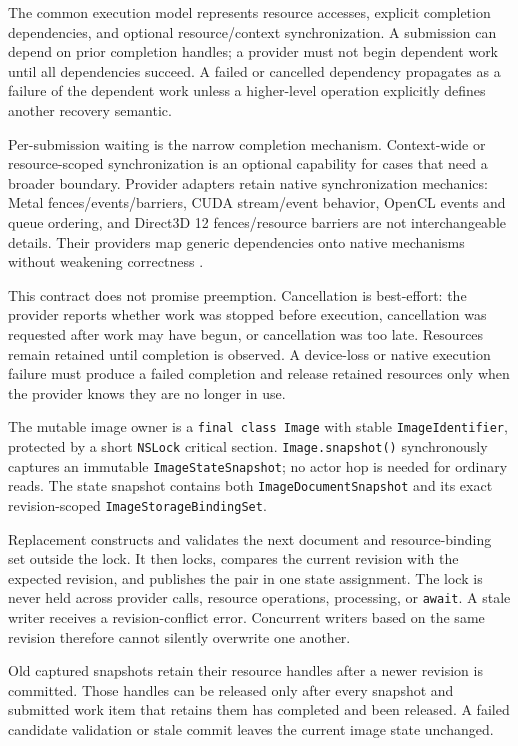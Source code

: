\documentclass[11pt,a4paper,oneside]{article}
\begin{document}
The common execution model represents resource accesses, explicit completion dependencies, and optional resource/context synchronization. A submission can depend on prior completion handles; a provider must not begin dependent work until all dependencies succeed. A failed or cancelled dependency propagates as a failure of the dependent work unless a higher-level operation explicitly defines another recovery semantic.

Per-submission waiting is the narrow completion mechanism. Context-wide or resource-scoped synchronization is an optional capability for cases that need a broader boundary. Provider adapters retain native synchronization mechanics: Metal fences/events/barriers, CUDA stream/event behavior, OpenCL events and queue ordering, and Direct3D 12 fences/resource barriers are not interchangeable details. Their providers map generic dependencies onto native mechanisms without weakening correctness \cite{metal-sync,opencl-spec,d3d12-queues,d3d12-barriers,cuda-guide}.

This contract does not promise preemption. Cancellation is best-effort: the provider reports whether work was stopped before execution, cancellation was requested after work may have begun, or cancellation was too late. Resources remain retained until completion is observed. A device-loss or native execution failure must produce a failed completion and release retained resources only when the provider knows they are no longer in use.

The mutable image owner is a \texttt{final class Image} with stable \texttt{ImageIdentifier}, protected by a short \texttt{NSLock} critical section. \texttt{Image.snapshot()} synchronously captures an immutable \texttt{ImageStateSnapshot}; no actor hop is needed for ordinary reads. The state snapshot contains both \texttt{ImageDocumentSnapshot} and its exact revision-scoped \texttt{ImageStorageBindingSet}.

Replacement constructs and validates the next document and resource-binding set outside the lock. It then locks, compares the current revision with the expected revision, and publishes the pair in one state assignment. The lock is never held across provider calls, resource operations, processing, or \texttt{await}. A stale writer receives a revision-conflict error. Concurrent writers based on the same revision therefore cannot silently overwrite one another.

Old captured snapshots retain their resource handles after a newer revision is committed. Those handles can be released only after every snapshot and submitted work item that retains them has completed and been released. A failed candidate validation or stale commit leaves the current image state unchanged.
\end{document}
